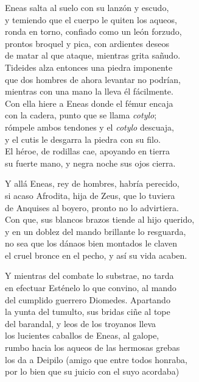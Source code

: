 Eneas salta al suelo con su lanzón y escudo,\\
y temiendo que el cuerpo le quiten los aqueos,\\
ronda en torno, confiado como un león forzudo,\\
prontos broquel y pica, con ardientes deseos\\
de matar al que ataque, mientras grita sañudo.\\
Tideides alza entonces una piedra imponente\\
que dos hombres de ahora levantar no podrían,\\
mientras con una mano la lleva él fácilmente.\\
Con ella hiere a Eneas donde el fémur encaja\\
con la cadera, punto que se llama \emph{cotylo};\\
rómpele ambos tendones y el \emph{cotylo} descuaja,\\
y el cutis le desgarra la piedra con su filo.\\
El héroe, de rodillas cae, apoyando en tierra\\
su fuerte mano, y negra noche sus ojos cierra.\par
Y allá Eneas, rey de hombres, habría perecido,\\
si acaso Afrodita, hija de Zeus, que lo tuviera\\
de Anquises al boyero, pronto no lo advirtiera.\\
Con que, sus blancos brazos tiende al hijo querido,\\
y en un doblez del mando brillante lo resguarda,\\
no sea que los dánaos bien montados le claven\\
el cruel bronce en el pecho, y así su vida acaben.\par
Y mientras del combate lo substrae, no tarda\\
en efectuar Esténelo lo que convino, al mando\\
del cumplido guerrero Diomedes. Apartando\\
la yunta del tumulto, sus bridas ciñe al tope\\
del barandal, y leos de los troyanos lleva\\
los lucientes caballos de Eneas, al galope,\\
rumbo hacia los aqueos de las hermosas grebas\\
los da a Deipilo (amigo que entre todos honraba,\\
por lo bien que su juicio con el suyo acordaba)\\

